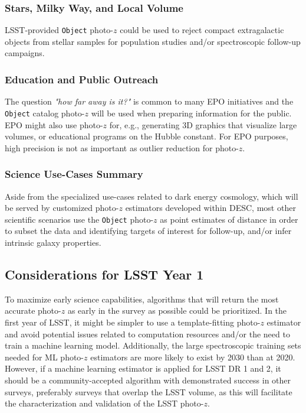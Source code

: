\documentclass[DM,lsstdraft,toc]{lsstdoc}
\begin{document}
\subsubsection{Stars, Milky Way, and Local Volume}
LSST-provided {\tt Object} photo-$z$ could be used to reject compact extragalactic objects from stellar samples for population studies and/or spectroscopic follow-up campaigns.

\subsubsection{Education and Public Outreach}
The question {\it "how far away is it?"} is common to many EPO initiatives and the {\tt Object} catalog photo-$z$ will be used when preparing information for the public.
EPO might also use photo-$z$ for, e.g., generating 3D graphics that visualize large volumes, or educational programs on the Hubble constant.
For EPO purposes, high precision is not as important as outlier reduction for photo-$z$.


\subsubsection{Science Use-Cases Summary}\label{sssec:use_sci_sum}
Aside from the specialized use-cases related to dark energy cosmology, which will be served by customized photo-$z$ estimators developed within DESC, most other scientific scenarios use the {\tt Object} photo-$z$ as point estimates of distance in order to subset the data and identifying targets of interest for follow-up, and/or infer intrinsic galaxy properties.

\subsection{Considerations for LSST Year 1}\label{ssec:use_LOY1}

To maximize early science capabilities, algorithms that will return the most accurate photo-$z$ as early in the survey as possible could be prioritized.
In the first year of LSST, it might be simpler to use a template-fitting photo-$z$ estimator and avoid potential issues related to computation resources and/or the need to train a machine learning model.
Additionally, the large spectroscopic training sets needed for ML photo-$z$ estimators are more likely to exist by 2030 than at 2020.
However, if a machine learning estimator is applied for LSST DR 1 and 2, it should be a community-accepted algorithm with demonstrated success in other surveys, preferably surveys that overlap the LSST volume, as this will facilitate the characterization and validation of the LSST photo-$z$.
\end{document}
